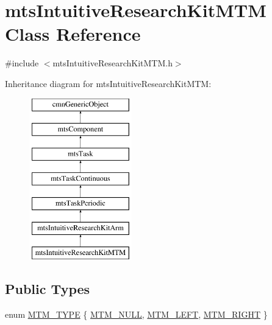 \hypertarget{classmts_intuitive_research_kit_m_t_m}{\section{mts\-Intuitive\-Research\-Kit\-M\-T\-M Class Reference}
\label{classmts_intuitive_research_kit_m_t_m}
}


{\ttfamily \#include $<$mts\-Intuitive\-Research\-Kit\-M\-T\-M.\-h$>$}

Inheritance diagram for mts\-Intuitive\-Research\-Kit\-M\-T\-M\-:\begin{figure}[H]
\begin{center}
\leavevmode
\includegraphics[height=7.000000cm]{d2/d1a/classmts_intuitive_research_kit_m_t_m}
\end{center}
\end{figure}
\subsection*{Public Types}
\begin{DoxyCompactItemize}
\item 
enum \hyperlink{classmts_intuitive_research_kit_m_t_m_a2122075f3ef6c751e5bf65b690bf5b69}{M\-T\-M\-\_\-\-T\-Y\-P\-E} \{ \hyperlink{classmts_intuitive_research_kit_m_t_m_a2122075f3ef6c751e5bf65b690bf5b69a9f51be777b8da63c667b740284ff3001}{M\-T\-M\-\_\-\-N\-U\-L\-L}, 
\hyperlink{classmts_intuitive_research_kit_m_t_m_a2122075f3ef6c751e5bf65b690bf5b69a3f0aff93b3bf7ee2002a1ec63be37144}{M\-T\-M\-\_\-\-L\-E\-F\-T}, 
\hyperlink{classmts_intuitive_research_kit_m_t_m_a2122075f3ef6c751e5bf65b690bf5b69ae91ef5d851b669c39fc7d9a62a4b6725}{M\-T\-M\-\_\-\-R\-I\-G\-H\-T}
 \}
\end{DoxyCompactItemize}

